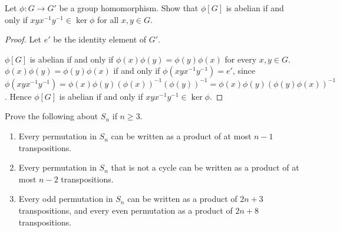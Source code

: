\newpage
\begin{exercise}
    Let $\phi: G\to G'$ be a group homomorphism. Show that $\phi[G]$ is abelian if and only if $xyx^{-1}y^{-1}\in \ker\phi$ for all $x,y\in G$.
\end{exercise}

\begin{proof}
    Let $e'$ be the identity element of $G'$.

    $\phi[G]$ is abelian if and only if $\phi(x)\phi(y) = \phi(y)\phi(x)$ for every $x,y\in G$. $\phi(x)\phi(y) = \phi(y)\phi(x)$ if and only if $\phi(xyx^{-1}y^{-1}) = e'$, since $\phi(xyx^{-1}y^{-1}) = \phi(x)\phi(y){(\phi(x))}^{-1}{(\phi(y))}^{-1} = \phi(x)\phi(y){(\phi(y)\phi(x))}^{-1}$. Hence $\phi[G]$ is abelian if and only if $xyx^{-1}y^{-1}\in\ker\phi$.
\end{proof}

\newpage
\begin{exercise}
    Prove the following about $S_{n}$ if $n\geq 3$.
    \begin{enumerate}[label={\textbf{\alph*.}}]
        \item Every permutation in $S_{n}$ can be written as a product of at most $n - 1$ transpositions.
        \item Every permutation in $S_{n}$ that is not a cycle can be written as a product of at most $n - 2$ transpositions.
        \item Every odd permutation in $S_{n}$ can be written as a product of $2n + 3$ transpositions, and every even permutation as a product of $2n + 8$ transpositions.
    \end{enumerate}
\end{exercise}


